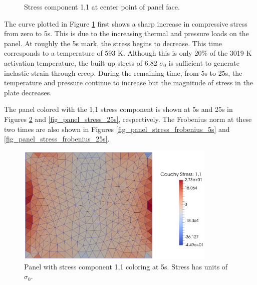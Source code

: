 \documentclass[conf]{new-aiaa}
\begin{document}
\begin{figure}[H]
  \centering
  \caption{ Stress component 1,1 at center point of panel face.}
  \label{fig_panel_stress_over_time}
\end{figure}

The curve plotted in Figure \ref{fig_panel_stress_over_time} first 
shows a sharp increase in compressive stress from zero to 5s.
This is due to the increasing thermal and pressure loads on the panel.
At roughly the 5s mark, the stress begins to decrease. 
This time corresponds to a temperature of 593 K. 
Although this is only 20\% of the 3019 K activation temperature,
the built up stress of 6.82 $\sigma_0$ is sufficient to generate 
inelastic strain through creep.
During the remaining time, from 5s to 25s, the temperature 
and pressure continue to increase but the magnitude of stress in the plate
decreases.

The panel colored with the 1,1 stress component is shown at 5s
and 25s in Figures \ref{fig_panel_stress_5s} and 
\ref{fig_panel_stress_25s}, respectively.
The Frobenius norm at these two times are also shown 
in Figures \ref{fig_panel_stress_frobenius_5s}
and \ref{fig_panel_stress_frobenius_25s}.

\begin{figure}[H] 
  \centering
    \includegraphics[width=0.85\textwidth, keepaspectratio]
    {panel_stress_5s}
  \caption{ Panel with stress component 1,1 coloring at 5s.
            Stress has units of $\sigma_0$.}
  \label{fig_panel_stress_5s}
\end{figure}
\end{document}
